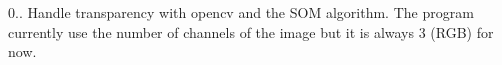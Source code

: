 
\begin{DoxyRefList}
\item[\label{todo__todo000001}%
\hypertarget{todo__todo000001}{}%
Global \hyperlink{main_8c_af3ed9c200de85b53c94cd18764b246a2}{main} (int argc, char $\ast$const argv\mbox{[}\mbox{]})]0.. Handle transparency with opencv and the S\-O\-M algorithm. The program currently use the number of channels of the image but it is always 3 (R\-G\-B) for now. 
\end{DoxyRefList}